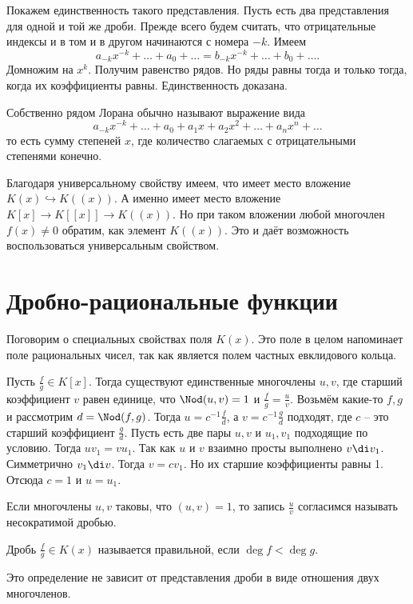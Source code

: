Покажем единственность такого представления. Пусть есть два представления для одной и той же дроби. Прежде всего будем считать, что отрицательные индексы и в том и в другом начинаются с номера $-k$. Имеем $$a_{-k}x^{-k}+\dots+a_0+\dots=b_{-k}x^{-k}+\dots +b_0 +\dots.$$
Домножим на $x^k$. Получим равенство рядов. Но ряды равны тогда и только тогда, когда их коэффициенты равны. Единственность доказана. 
\endproof

\rm Собственно рядом Лорана обычно называют выражение вида $$a_{-k}x^{-k}+\dots+a_0+a_1x+a_2x^2+\dots+a_n x^n +\dots$$
то есть сумму степеней $x$, где количество слагаемых с отрицательными степенями конечно.
\erm

Благодаря универсальному свойству имеем, что имеет место вложение $K(x) \hookrightarrow K((x))$. А именно имеет место вложение $K[x]\to K[[x]]\to K((x))$. Но при таком вложении любой многочлен $f(x)\neq 0$ обратим, как элемент $K((x))$. Это и даёт возможность воспользоваться универсальным свойством.




\section{Дробно-рациональные функции}


Поговорим о специальных свойствах поля $K(x)$. Это поле в целом напоминает поле рациональных чисел, так как является полем частных евклидового кольца.

\lm Пусть $\frac{f}{g} \in K[x]$. Тогда существуют  единственные многочлены  $u,v$, где старший коэффициент $v$ равен единице, что $\Nod(u,v)=1$ и $\frac{f}{g}=\frac{u}{v}$. 
\elm
\proof Возьмём какие-то $f,g$ и рассмотрим $d=\Nod(f,g)$. Тогда $u=c^{-1}\frac{f}{d}$, а $v=c^{-1}\frac{g}{d}$ подходят, где $c$ -- это старший коэффициент $\frac{g}{d}$. Пусть есть две пары $u,v$ и $u_1,v_1$ подходящие по условию. Тогда $uv_1=vu_1$. Так как $u$ и $v$ взаимно просты выполнено $v\di v_1$. Симметрично $v_1\di v$. Тогда $v=cv_1$. Но их старшие коэффициенты равны 1. Отсюда $c=1$ и $u=u_1$.
\endproof

\dfn Если многочлены $u,v$ таковы, что $(u,v)=1$, то запись $\frac{u}{v}$ согласимся называть несократимой дробью.
\edfn

\dfn Дробь $\frac{f}{g} \in K(x)$ называется правильной, если $\deg f< \deg g$.
\edfn

\rm Это определение не зависит от представления дроби в виде отношения двух многочленов.
\erm

